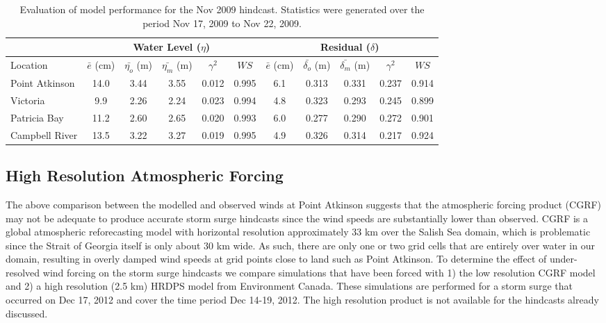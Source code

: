 \documentclass[pdftex,10pt]{article}
\begin{document}
\begin{table}[h]
\centering 
\begin{tabular}{|l |c c c c c | c c c c c|} 
\hline 
& \multicolumn{5}{|c|}{Water Level ($\eta$)}        & \multicolumn{5}{|c|}{Residual ($\delta$)} \\ 
\hline 
Location       & $\bar{e}$ (cm) & $\bar{\eta_{o}}$ (m) & $\bar{\eta_{m}}$ (m) & $\gamma^2$ & $WS$   & $\bar{e}$ (cm) & $\bar{\delta_{o}}$ (m) & $\bar{\delta_{m}}$ (m) & $\gamma^2$ & $WS$ \\
\hline 
Point Atkinson & 14.0           &  3.44                & 3.55                 &   0.012    & 0.995  &  6.1           &  0.313                 & 0.331                  &  0.237     & 0.914 \\
Victoria       &  9.9           &  2.26                & 2.24                 &   0.023    & 0.994  &  4.8           &  0.323                 & 0.293                  &  0.245     & 0.899 \\
Patricia Bay   & 11.2           &  2.60                & 2.65                 &   0.020    & 0.993  &  6.0           &  0.277                 & 0.290                  &  0.272     & 0.901 \\
Campbell River & 13.5           &  3.22                & 3.27                 &   0.019    & 0.995  &  4.9           &  0.326                 & 0.314                  &  0.217     & 0.924 \\
\hline 
\end{tabular}
\caption{Evaluation of model performance for the Nov 2009 hindcast. Statistics were generated over the period Nov 17, 2009 to Nov 22, 2009.}
\label{tab:nov2009stat} 
\end{table}



\subsection{High Resolution Atmospheric Forcing}
The above comparison between the modelled and observed winds at Point Atkinson suggests that the atmospheric forcing product (CGRF) may not be adequate to produce accurate storm surge hindcasts since the wind speeds are substantially lower than observed. CGRF is a global atmospheric reforecasting model with horizontal resolution approximately 33 km over the Salish Sea domain, which is problematic since the Strait of Georgia itself is only about 30 km wide. As such, there are only one or two grid cells that are entirely over water in our domain, resulting in overly damped wind speeds at grid points close to land such as Point Atkinson. To determine the effect of under-resolved wind forcing on the storm surge hindcasts we compare simulations that have been forced with 1) the low resolution CGRF model and 2) a high resolution (2.5 km) HRDPS model from Environment Canada.  These simulations are performed for a storm surge that occurred on Dec 17, 2012 and cover the time period Dec 14-19, 2012. The high resolution product is not available for the hindcasts already discussed. 
\end{document}

